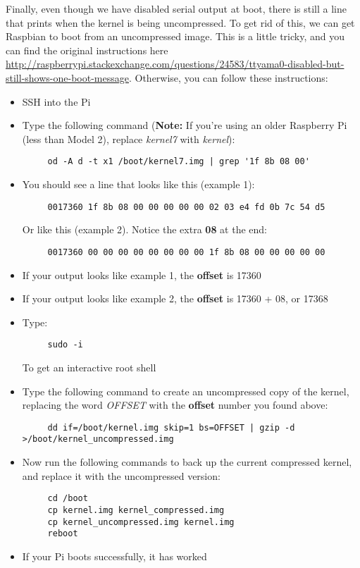 \documentclass[10pt]{article}
\begin{document}
Finally, even though we have disabled serial output at boot, there is still a line that prints when the kernel is being uncompressed. To get rid of this, we can 
get Raspbian to boot from an uncompressed image. This is a little tricky, and you can find the original instructions here 
\url{http://raspberrypi.stackexchange.com/questions/24583/ttyama0-disabled-but-still-shows-one-boot-message}. Otherwise, you can follow these instructions:

\begin{itemize}
 \item SSH into the Pi
 \item Type the following command (\textbf{Note:} If you're using an older Raspberry Pi (less than Model 2), replace \textit{kernel7} with \textit{kernel}):
	\begin{verbatim}
	 od -A d -t x1 /boot/kernel7.img | grep '1f 8b 08 00'
	\end{verbatim}
  \item You should see a line that looks like this (example 1):
	\begin{verbatim}
	 0017360 1f 8b 08 00 00 00 00 00 02 03 e4 fd 0b 7c 54 d5
	\end{verbatim}
	Or like this (example 2). Notice the extra \textbf{08} at the end:
	\begin{verbatim}
	 0017360 00 00 00 00 00 00 00 00 1f 8b 08 00 00 00 00 00
	\end{verbatim}
  \item If your output looks like example 1, the \textbf{offset} is 17360
  \item If your output looks like example 2, the \textbf{offset} is 17360 + 08, or 17368
  \item Type:
	\begin{verbatim}
	 sudo -i
	\end{verbatim}
	To get an interactive root shell
  \item Type the following command to create an uncompressed copy of the kernel, replacing the word \textit{OFFSET} with the \textbf{offset} number
	you found above:
	\begin{verbatim}
	 dd if=/boot/kernel.img skip=1 bs=OFFSET | gzip -d >/boot/kernel_uncompressed.img
	\end{verbatim}
  \item Now run the following commands to back up the current compressed kernel, and replace it with the uncompressed version:
	\begin{verbatim}
	 cd /boot
	 cp kernel.img kernel_compressed.img
	 cp kernel_uncompressed.img kernel.img
	 reboot
	\end{verbatim}
  \item If your Pi boots successfully, it has worked
\end{itemize}
\end{document}
